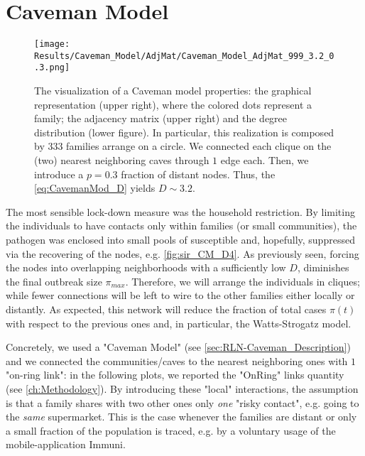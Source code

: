 \documentclass[a4paper,10pt]{book} %
\theoremstyle{definition}
\begin{document}
\clearpage
\section{Caveman Model}
\label{sec:res_CM}
\begin{figure}[t]
	\centering
	\texttt{[image: Results/Caveman\_Model/AdjMat/Caveman\_Model\_AdjMat\_999\_3.2\_0.3.png]}
	\caption{The visualization of a Caveman model properties: the graphical representation (upper right), where the colored dots represent a family; the adjacency matrix (upper right) and the degree distribution (lower figure). In particular, this realization is composed by 333 families arrange on a circle. We connected each clique on the (two) nearest neighboring caves through $1$ edge each. Then, we introduce a $p = 0.3$ fraction of distant nodes. Thus, the \autoref{eq:CavemanMod_D} yields $D \sim 3.2$.}
	\label{fig:CM_AdjMat_p0.3}
\end{figure}
The most sensible lock-down measure was the household restriction. By limiting the individuals to have contacts only within families (or small communities), the pathogen was enclosed into small pools of susceptible and, hopefully, suppressed via the recovering of the nodes, e.g. \autoref{fig:sir_CM_D4}. As previously seen, forcing the nodes into overlapping neighborhoods with a sufficiently low $ D$, diminishes the final outbreak size $ \pi_{max}$. Therefore, we will arrange the individuals in cliques; while fewer connections will be left to wire to the other families either locally or distantly. As expected, this network will reduce the fraction of total cases $\pi(t)$ with respect to the previous ones and, in particular, the Watts-Strogatz model.

Concretely, we used a "Caveman Model" (see \autoref{sec:RLN-Caveman_Description}) and we connected the communities/caves to the nearest neighboring ones with $ 1$ "on-ring link": in the following plots, we reported the "OnRing" links quantity (see \autoref{ch:Methodology}). By introducing these "local" interactions, the assumption is that a family shares with two other ones only \textit{one} "risky contact", e.g. going to the \textit{same} supermarket. This is the case whenever the families are distant or only a small fraction of the population is traced, e.g. by a voluntary usage of the mobile-application Immuni.
\end{document}
